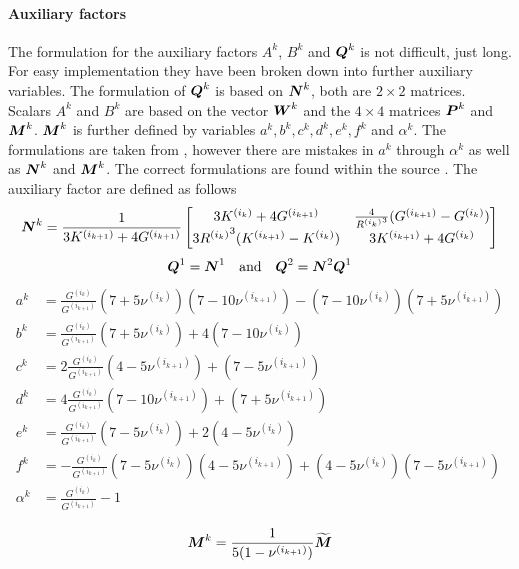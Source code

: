\paragraph{Auxiliary factors}
The formulation for the auxiliary factors $A^k$, $B^k$ and $\boldsymbol{Q}^k$ is not difficult, just long.
For easy implementation they have been broken down into further auxiliary variables.
The formulation of $\boldsymbol{Q}^k$ is based on $\boldsymbol{N}^k$, both are $2 \times 2$ matrices.
Scalars $A^k$ and $B^k$ are based on the vector $\boldsymbol{W}^k$ and the $4 \times 4$ matrices $\boldsymbol{P}^k$ and $\boldsymbol{M}^k$.
$\boldsymbol{M}^k$ is further defined by variables $a^k, b^k, c^k, d^k, e^k,f^k$ and $\alpha^k$.
The formulations are taken from \cite{nee_2012_ammf}, however there are mistakes in $a^k$ through $\alpha^k$ as well as $\boldsymbol{N}^k$ and $\boldsymbol{M}^k$.
The correct formulations are found within the source \cite{her_1993_nlib}.
The auxiliary factor are defined as follows
\begin{align}
	\boldsymbol{N}^k = \frac{1}{3K^{(i_{k+1})}+4G^{(i_{k+1})}}
	\begin{bmatrix}
		3K^{(i_{k})}+4G^{(i_{k+1})} & \frac{4}{{R^{(i_{k})}}^3} (G^{(i_{k+1})}-G^{(i_{k})})\\
		3{R^{(i_{k})}}^3 (K^{(i_{k+1})}-K^{(i_{k})}) & 3K^{(i_{k+1})}+4G^{(i_{k})}
	\end{bmatrix}
\end{align}
\begin{align}
	\boldsymbol{Q}^1 = \boldsymbol{N}^1\quad \text{and} \quad \boldsymbol{Q}^2 = \boldsymbol{N}^2\boldsymbol{Q}^1
\end{align}
\begin{align}
	a^k &= \frac{G^{(i_k)}}{G^{(i_{k+1})}}(7+5\nu^{(i_k)})(7 - 10 \nu^{(i_{k+1})}) - (7-10\nu^{(i_k)})(7 + 5 \nu^{(i_{k+1})})\\
	b^k &= \frac{G^{(i_k)}}{G^{(i_{k+1})}}(7+5\nu^{(i_k)}) + 4(7-10\nu^{(i_k)})\\
	c^k &= 2\frac{G^{(i_k)}}{G^{(i_{k+1})}}(4-5\nu^{(i_{k+1})}) + (7 - 5 \nu^{(i_{k+1})})\\
	d^k &= 4\frac{G^{(i_k)}}{G^{(i_{k+1})}}(7-10\nu^{(i_{k+1})}) + (7 + 5 \nu^{(i_{k+1})})\\
	e^k &= \frac{G^{(i_k)}}{G^{(i_{k+1})}}(7-5\nu^{(i_k)}) + 2(4-5\nu^{(i_k)})\\
	f^k &= -\frac{G^{(i_k)}}{G^{(i_{k+1})}}(7-5\nu^{(i_k)})(4 - 5 \nu^{(i_{k+1})}) + (4-5\nu^{(i_k)})(7 -5 \nu^{(i_{k+1})})\\
	\alpha^k &= \frac{G^{(i_k)}}{G^{(i_{k+1})}} - 1
\end{align}

\begin{align}
	\boldsymbol{M}^k = \frac{1}{5(1-\nu^{(i_{k+1})})}\widetilde{\boldsymbol{M}}
\end{align}


